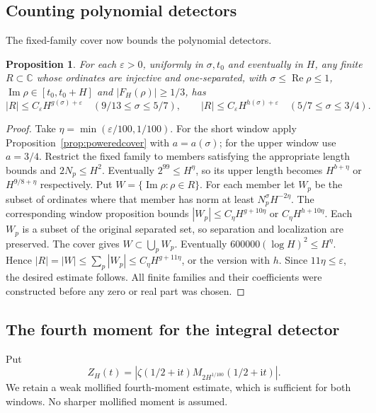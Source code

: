 \documentclass[11pt,a4paper,oneside]{article}
\newtheorem{proposition}[theorem]{Proposition}
\theoremstyle{definition}
\newcommand{\C}{\mathbb C}
\newcommand{\eps}{\varepsilon}
\newcommand{\ii}{\mathrm i}
\newcommand{\Rea}{\operatorname{Re}}
\newcommand{\Ima}{\operatorname{Im}}
\numberwithin{equation}{section}
\begin{document}
\subsection{Counting polynomial detectors}
The fixed-family cover now bounds the polynomial detectors.
\begin{proposition}\label{prop:typeI}
For each $\eps>0$, uniformly in $\sigma,t_0$ and eventually in $H$,
any finite $R\subset\C$ whose ordinates are injective and one-separated,
with $\sigma\le\Rea\rho\le1$, $\Ima\rho\in[t_0,t_0+H]$ and
$|F_H(\rho)|\ge1/3$, has
\[
 |R|\le C_\eps H^{g(\sigma)+\eps}\quad(9/13\le\sigma\le5/7),
 \qquad |R|\le C_\eps H^{h(\sigma)+\eps}\quad(5/7\le\sigma\le3/4).
\]
\end{proposition}
\begin{proof}
Take $\eta=\min(\eps/100,1/100)$. For the short window apply
Proposition~\ref{prop:poweredcover} with $a=a(\sigma)$;
for the upper window use $a=3/4$.
Restrict the fixed family to members satisfying the appropriate length
bounds and $2N_p\le H^2$. Eventually $2^{99}\le H^\eta$, so its upper
length becomes $H^{b+\eta}$ or $H^{9/8+\eta}$ respectively.
Put $W=\{\Ima\rho:\rho\in R\}$. For each member let $W_p$ be the subset of ordinates where that member
has norm at least $N_p^\sigma H^{-2\eta}$.
The corresponding window proposition bounds
$|W_p|\le C_\eta H^{g+10\eta}$ or $C_\eta H^{h+10\eta}$.
Each $W_p$ is a subset of the original separated set, so separation and
localization are preserved. The cover gives $W\subset\bigcup_pW_p$.
Eventually $600000(\log H)^2\le H^\eta$. Hence
$|R|=|W|\le\sum_p|W_p|\le C_\eta H^{g+11\eta}$, or the version with
$h$. Since $11\eta\le\eps$, the desired estimate follows.
All finite families and their coefficients were constructed before any zero
or real part was chosen.
\end{proof}
\subsection{The fourth moment for the integral detector}
Put
\[
 Z_H(t)=\left|\zeta(1/2+\ii t)M_{2H^{1/100}}(1/2+\ii t)\right|.
\]
We retain a weak mollified fourth-moment estimate, which is sufficient for both windows. No sharper mollified moment is assumed.
\end{document}
